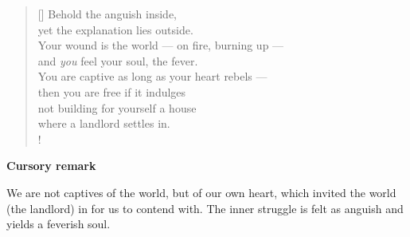 \documentclass[a4paper,12pt,twoside,final]{book}
\begin{document}
\newpage


\settowidth{\versewidth}{Your wound is the world --- on fire, burning up ---}

\begin{verse}[\versewidth]
  Behold the anguish inside, \\
  yet the explanation lies outside. \\
  Your wound is the world --- on fire, burning up --- \\
  and \emph{you} feel your soul, the fever. \\
  You are captive as long as your heart rebels --- \\
  then you are free if it indulges \\
  not building for yourself a house \\
  where a landlord settles in. \\!
\end{verse}


\bigskip

\noindent \textbf{Cursory remark}

\medskip

We are not captives of the world, but of our own heart, which invited
the world (the landlord) in for us to contend with. The inner struggle
is felt as anguish and yields a feverish soul.

\newpage

\settowidth{\versewidth}{nem raksz magadnak olyan házat,}
\end{document}
